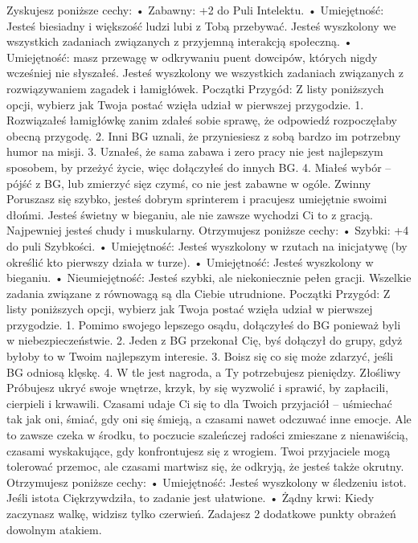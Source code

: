 Zyskujesz poniższe cechy:
    • Zabawny: +2 do Puli Intelektu.
    • Umiejętność: Jesteś biesiadny i większość ludzi lubi z Tobą przebywać. Jesteś wyszkolony we wszystkich zadaniach związanych z przyjemną interakcją społeczną.
    • Umiejętność: masz przewagę w odkrywaniu puent dowcipów, których nigdy wcześniej nie słyszałeś. Jesteś wyszkolony we wszystkich zadaniach związanych z rozwiązywaniem zagadek i łamigłówek.
Początki Przygód: Z listy poniższych opcji, wybierz jak Twoja postać wzięła udział w pierwszej przygodzie.
1. Rozwiązałeś łamigłówkę zanim zdałeś sobie sprawę, że odpowiedź rozpoczęłaby obecną przygodę.
2. Inni BG uznali, że przyniesiesz z sobą bardzo im potrzebny humor na misji.
3. Uznałeś, że sama zabawa i zero pracy nie jest najlepszym sposobem, by przeżyć życie, więc dołączyłeś do innych BG.
4. Miałeś wybór – pójść z BG, lub zmierzyć sięz czymś, co nie jest zabawne w ogóle. 
Zwinny
Poruszasz się szybko, jesteś dobrym sprinterem i pracujesz umiejętnie swoimi dłońmi. Jesteś świetny w bieganiu, ale nie zawsze wychodzi Ci to z gracją. Najpewniej jesteś chudy i muskularny.
Otrzymujesz poniższe cechy:
    • Szybki: +4 do puli Szybkości.
    • Umiejętność: Jesteś wyszkolony w rzutach na inicjatywę (by określić kto pierwszy działa w turze).
    • Umiejętność: Jesteś wyszkolony w bieganiu.
    • Nieumiejętność: Jesteś szybki, ale niekoniecznie pełen gracji. Wszelkie zadania związane z równowagą są dla Ciebie utrudnione. 
Początki Przygód: Z listy poniższych opcji, wybierz jak Twoja postać wzięła udział w pierwszej przygodzie.
1. Pomimo swojego lepszego osądu, dołączyłeś do BG ponieważ byli w niebezpieczeństwie. 
2. Jeden z BG przekonał Cię, byś dołączył do grupy, gdyż byłoby to w Twoim najlepszym interesie.
3. Boisz się co się może zdarzyć, jeśli BG odniosą klęskę.
4. W tle jest nagroda, a Ty potrzebujesz pieniędzy.
Złośliwy
Próbujesz ukryć swoje wnętrze, krzyk, by się wyzwolić i sprawić, by zapłacili, cierpieli i krwawili. Czasami udaje Ci się to dla Twoich przyjaciół – uśmiechać tak jak oni, śmiać, gdy oni się śmieją, a czasami nawet odczuwać inne emocje. Ale to zawsze czeka w środku, to poczucie szaleńczej radości zmieszane z nienawiścią, czasami wyskakujące, gdy konfrontujesz się z wrogiem. Twoi przyjaciele mogą tolerować przemoc, ale czasami martwisz się, że odkryją, że jesteś także okrutny.
Otrzymujesz poniższe cechy:
    • Umiejętność: Jesteś wyszkolony w śledzeniu istot. Jeśli istota Ciękrzywdziła, to zadanie jest ułatwione.
    • Żądny krwi: Kiedy zaczynasz walkę, widzisz tylko czerwień. Zadajesz 2 dodatkowe punkty obrażeń dowolnym atakiem. 
